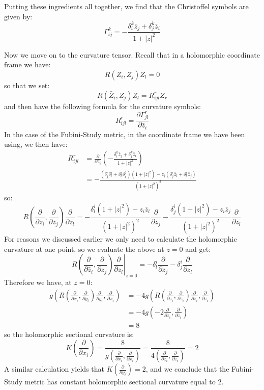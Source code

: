 \documentclass[11pt]{amsart}
\theoremstyle{definition}
\def \del{ \partial }
\begin{document}
%
Putting these ingredients all together, we find that the Christoffel symbols are given by:
%
$$ \Gamma^k_{ij} = - \frac{ \delta^k_i \bar{z}_j + \delta^k_j \bar{z}_i }{ 1 + |z|^2 } $$

Now we move on to the curvature tensor.  Recall that in a holomorphic coordinate frame we have:
%
$$ R(Z_i, Z_j)Z_l = 0$$
%
so that we set:
%
$$ R( \bar{Z}_i, Z_j )Z_l = R_{ijl}^r Z_r $$
%
and then have the following formula for the curvature symbols:
%
$$ R_{ijl}^r = \frac{ \del \Gamma_{jl}^r }{ \del \bar{z}_i } $$
%
In the case of the Fubini-Study metric, in the coordinate frame we have been using, we then have:
%
\begin{align*}
R_{ijl}^r &= \frac{\del}{\del \bar{z}_i } \left( - \frac{ \delta^k_i \bar{z}_j + \delta^k_j \bar{z}_i }{ 1 + |z|^2 } \right) \\
&= - \frac{ (\delta^r_j \delta^i_l + \delta^r_l \delta^j_i)( 1 + |z|^2 ) - z_i ( \delta^r_j \bar{z}_l + \delta^r_l \bar{z}_j ) }{ (1 + |z|^2)^2 } 
\end{align*}
%
so:
%
$$ R \left( \frac{ \del }{ \del \bar{z}_i }, \frac{ \del }{ \del z_j } \right) \frac{ \del }{ \del z_l } = - \frac{ \delta^i_l (1 + |z|^2) - z_i \bar{z}_l }{ (1 + |z|^2)^2 } \frac{ \del }{ \del z_j } - \frac{ \delta^i_j (1 + |z|^2) - z_i \bar{z}_j }{ (1 + |z|^2)^2 } \frac{ \del }{ \del z_l } $$
%
For reasons we discussed earlier we only need to calculate the holomorphic curvature at one point, so we evaluate the above at $z=0$ and get:
%
$$ R \left. \left( \frac{ \del }{ \del \bar{z}_i }, \frac{ \del }{ \del z_j } \right) \frac{ \del }{ \del z_l } \right|_{z=0} = - \delta^i_l \frac{ \del }{ \del z_j } - \delta^i_j \frac{ \del }{ \del z_l }$$
%
Therefore we have, at $z=0$:
%
\begin{align*} g \left( R \left( \frac{ \del }{ \del x_i }, \frac{ \del }{ \del y_i } \right) \frac{ \del }{ \del y_i }, \frac{ \del }{ \del x_i } \right) &= - 4 g \left( R \left( \frac{ \del }{ \del \bar{z}_i }, \frac{ \del }{ \del z_i } \right) \frac{ \del }{ \del z_i }, \frac{ \del }{ \del \bar{z}_i } \right) \\
&= -4 g \left( - 2 \frac{ \del }{ \del z_i}, \frac{ \del }{ \del \bar{z}_i } \right) \\
&= 8 
\end{align*}
%
so the holomorphic sectional curvature is:
%
$$ K \left( \frac{ \del }{ \del x_i } \right) = \frac{8}{ g \left( \frac{ \del }{ \del x_i }, \frac{ \del }{ \del x_i } \right) } = \frac{8}{4 \left( \frac{ \del }{ \del z_i }, \frac{ \del }{ \del \bar{z}_i } \right) } = 2 $$
%
A similar calculation yields that $K \left( \frac{ \del }{ \del y_i } \right) = 2$, and we conclude that the Fubini-Study metric has constant holomorphic sectional curvature equal to $2$.
%
\end{document}
